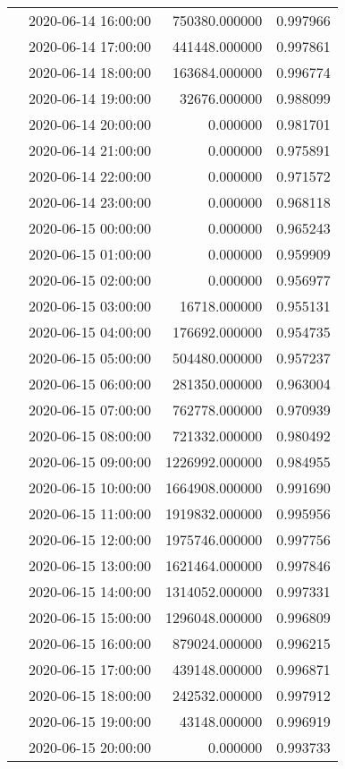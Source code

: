 \begin{tabular}{llrr}
 & 2020-06-14 16:00:00 & 750380.000000 & 0.997966 \\
 & 2020-06-14 17:00:00 & 441448.000000 & 0.997861 \\
 & 2020-06-14 18:00:00 & 163684.000000 & 0.996774 \\
 & 2020-06-14 19:00:00 & 32676.000000 & 0.988099 \\
 & 2020-06-14 20:00:00 & 0.000000 & 0.981701 \\
 & 2020-06-14 21:00:00 & 0.000000 & 0.975891 \\
 & 2020-06-14 22:00:00 & 0.000000 & 0.971572 \\
 & 2020-06-14 23:00:00 & 0.000000 & 0.968118 \\
 & 2020-06-15 00:00:00 & 0.000000 & 0.965243 \\
 & 2020-06-15 01:00:00 & 0.000000 & 0.959909 \\
 & 2020-06-15 02:00:00 & 0.000000 & 0.956977 \\
 & 2020-06-15 03:00:00 & 16718.000000 & 0.955131 \\
 & 2020-06-15 04:00:00 & 176692.000000 & 0.954735 \\
 & 2020-06-15 05:00:00 & 504480.000000 & 0.957237 \\
 & 2020-06-15 06:00:00 & 281350.000000 & 0.963004 \\
 & 2020-06-15 07:00:00 & 762778.000000 & 0.970939 \\
 & 2020-06-15 08:00:00 & 721332.000000 & 0.980492 \\
 & 2020-06-15 09:00:00 & 1226992.000000 & 0.984955 \\
 & 2020-06-15 10:00:00 & 1664908.000000 & 0.991690 \\
 & 2020-06-15 11:00:00 & 1919832.000000 & 0.995956 \\
 & 2020-06-15 12:00:00 & 1975746.000000 & 0.997756 \\
 & 2020-06-15 13:00:00 & 1621464.000000 & 0.997846 \\
 & 2020-06-15 14:00:00 & 1314052.000000 & 0.997331 \\
 & 2020-06-15 15:00:00 & 1296048.000000 & 0.996809 \\
 & 2020-06-15 16:00:00 & 879024.000000 & 0.996215 \\
 & 2020-06-15 17:00:00 & 439148.000000 & 0.996871 \\
 & 2020-06-15 18:00:00 & 242532.000000 & 0.997912 \\
 & 2020-06-15 19:00:00 & 43148.000000 & 0.996919 \\
 & 2020-06-15 20:00:00 & 0.000000 & 0.993733 \\

\end{tabular}
